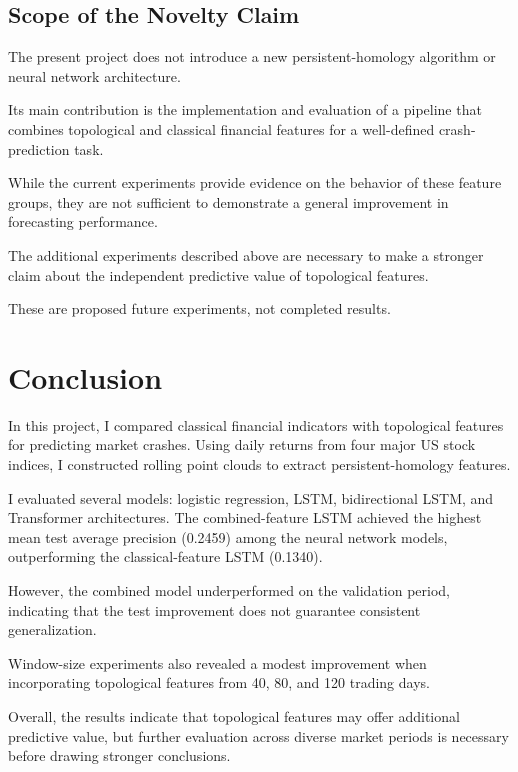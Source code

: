 \documentclass[oneside,english,11pt]{article}
\begin{document}
\subsection{Scope of the Novelty Claim}

The present project does not introduce a new persistent-homology algorithm or neural network architecture. 

Its main contribution is the implementation and evaluation of a pipeline that combines topological and classical financial features for a well-defined crash-prediction task. 

While the current experiments provide evidence on the behavior of these feature groups, they are not sufficient to demonstrate a general improvement in forecasting performance. 

The additional experiments described above are necessary to make a stronger claim about the independent predictive value of topological features. 

These are proposed future experiments, not completed results.

\section{Conclusion}
\label{sec:conclusion}


In this project, I compared classical financial indicators with topological features for predicting market crashes.
Using daily returns from four major US stock indices, I constructed rolling point clouds to extract persistent-homology features.

I evaluated several models: logistic regression, LSTM, bidirectional LSTM, and Transformer architectures. The combined-feature LSTM achieved the highest mean test average precision (0.2459) among the neural network models, outperforming the classical-feature LSTM (0.1340).

However, the combined model underperformed on the validation period, indicating that the test improvement does not guarantee consistent generalization.

Window-size experiments also revealed a modest improvement when incorporating topological features from 40, 80, and 120 trading days. 

Overall, the results indicate that topological features may offer additional predictive value, but further evaluation across diverse market periods is necessary before drawing stronger conclusions.




\end{document}
